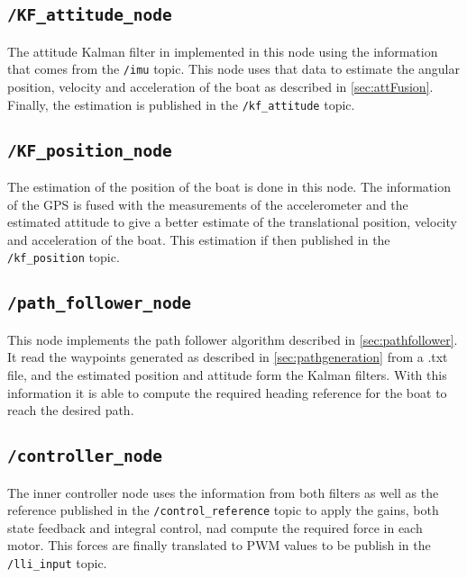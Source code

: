 \subsection*{\lstinline[style=cinline]{/KF_attitude_node}}
The attitude Kalman filter in implemented in this node using the information that comes from the \lstinline[style=cinline]{/imu} topic. This node uses that data to estimate the angular position, velocity and acceleration of the boat as described in \autoref{sec:attFusion}. Finally, the estimation is published in the \lstinline[style=cinline]{/kf_attitude} topic.

\subsection*{\lstinline[style=cinline]{/KF_position_node}}
The estimation of the position of the boat is done in this node. The information of the GPS is fused with the measurements of the accelerometer and the estimated attitude to give a better estimate of the translational position, velocity and acceleration of the boat. This estimation if then  published in the \lstinline[style=cinline]{/kf_position} topic.

\subsection*{\lstinline[style=cinline]{/path_follower_node}}
This node implements the path follower algorithm described in \autoref{sec:pathfollower}. It read the waypoints generated as described in \autoref{sec:pathgeneration} from a .txt file, and the estimated position and attitude form the Kalman filters. With this information it is able to compute the required heading reference for the boat to reach the desired path.

\subsection*{\lstinline[style=cinline]{/controller_node}}
The inner controller node uses the information from both filters as well as the reference published in the \lstinline[style=cinline]{/control_reference} topic to apply the gains, both state feedback and integral control, nad compute the required force in each motor. This forces are finally translated to PWM values to be publish in the \lstinline[style=cinline]{/lli_input} topic.

